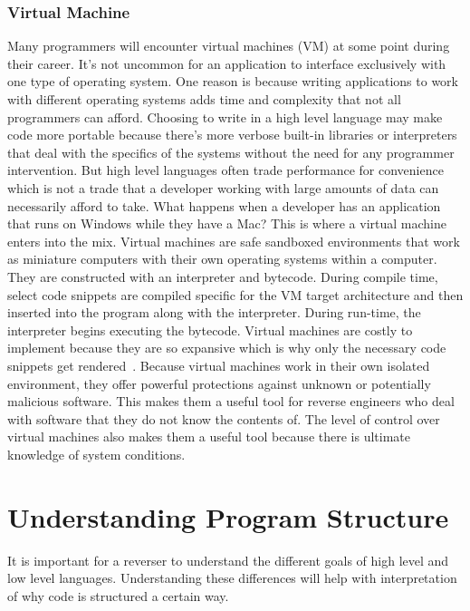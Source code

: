\documentclass[12pt]{article}
\begin{document}
\subsubsection{Virtual Machine}
Many programmers will encounter virtual machines (VM) at some point during their career. It’s not uncommon for an application to interface exclusively with one type of operating system. One reason is because writing applications to work with different operating systems adds time and complexity that not all programmers can afford. Choosing to write in a high level language may make code more portable because there’s more verbose built-in libraries or interpreters that deal with the specifics of the systems without the need for any programmer intervention. But high level languages often trade performance for convenience which is not a trade that a developer working with large amounts of data can necessarily afford to take.
What happens when a developer has an application that runs on Windows while they have a Mac? This is where a virtual machine enters into the mix. Virtual machines are safe sandboxed environments that work as miniature computers with their own operating systems within a computer. They are constructed with an interpreter and bytecode. During compile time, select code snippets are compiled specific for the VM target architecture and then inserted into the program along with the interpreter. During run-time, the interpreter begins executing the bytecode. Virtual machines are costly to implement because they are so expansive which is why only the necessary code snippets get rendered~\cite{MasteringRE}.
Because virtual machines work in their own isolated environment, they offer powerful protections against unknown or potentially malicious software. This makes them a useful tool for reverse engineers who deal with software that they do not know the contents of. The level of control over virtual machines also makes them a useful tool because there is ultimate knowledge of system conditions.


\section{Understanding Program Structure}
It is important for a reverser to understand the different goals of high level and low level languages. Understanding these differences will help with interpretation of why code is structured a certain way.
\end{document}
